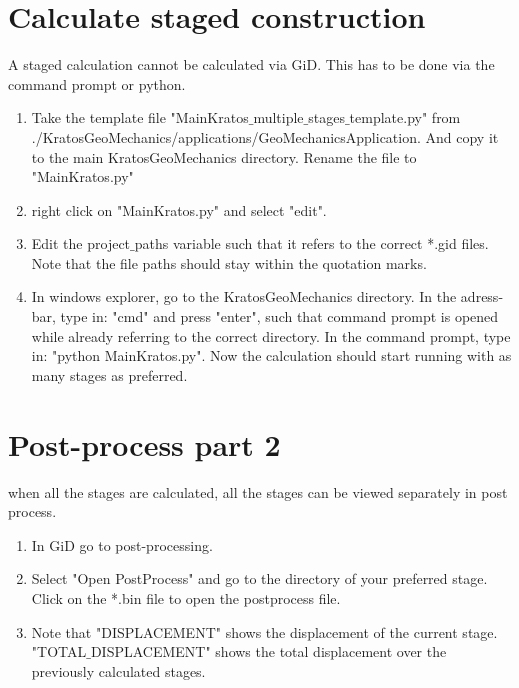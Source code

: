 \section{Calculate staged construction}
A staged calculation cannot be calculated via GiD. This has to be done via the command prompt or python.
\begin{enumerate}[resume]
	\item Take the template file "MainKratos$\_$multiple$\_$stages$\_$template.py" from ./KratosGeoMechanics/applications/GeoMechanicsApplication. And copy it to the main KratosGeoMechanics directory. Rename the file to "MainKratos.py"
	
	\item right click on "MainKratos.py" and select "edit". 
	\item Edit the project$\_$paths variable such that it refers to the correct *.gid files. Note that the file paths should stay within the quotation marks.
	
	\item In windows explorer, go to the KratosGeoMechanics directory. In the adress-bar, type in: "cmd" and press "enter", such that command prompt is opened while already referring to the correct directory. In the command prompt, type in: "python MainKratos.py". Now the calculation should start running with as many stages as preferred. 
	
\end{enumerate}

\section{Post-process part 2}
when all the stages are calculated, all the stages can be viewed separately in post process.

\begin{enumerate}[resume]
	\item In GiD go to post-processing. 
	\item Select "Open PostProcess" and go to the directory of your preferred stage. Click on the *.bin file to open the postprocess file. 
	\item Note that "DISPLACEMENT" shows the displacement of the current stage. "TOTAL$\_$DISPLACEMENT" shows the total displacement over the previously calculated stages. 
	
\end{enumerate}


	
